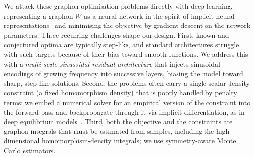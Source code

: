 \documentclass[11pt]{article}
\theoremstyle{plain}
\theoremstyle{definition}
\theoremstyle{remark}
\begin{document}
We attack these graphon-optimisation problems directly with deep learning, representing a graphon $W$ as a neural network in the spirit of implicit neural representations~\citep{park2019deepsdf,mescheder2019occupancy,chen2019learning} and minimising the objective by gradient descent on the network parameters. Three recurring challenges shape our design. First, known and conjectured optima are typically step-like, and standard architectures struggle with such targets because of their bias toward smooth functions. We address this with a \emph{multi-scale sinusoidal residual architecture} that injects sinusoidal encodings of growing frequency into successive layers, biasing the model toward sharp, step-like solutions. Second, the problems often carry a single scalar density constraint (a fixed homomorphism density) that is poorly handled by penalty terms; we embed a numerical solver for an empirical version of the constraint into the forward pass and backpropagate through it via implicit differentiation, as in deep equilibrium models~\citep{bai2019deep}. Third, both the objective and the constraints are graphon integrals that must be estimated from samples, including the high-dimensional homomorphism-density integrals; we use symmetry-aware Monte Carlo estimators.
\end{document}
